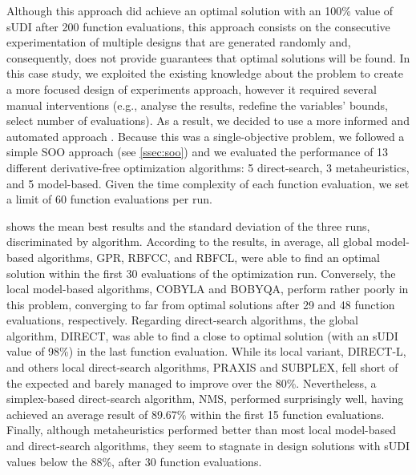 Although this approach did achieve an optimal solution with an 100\% value of sUDI after 200 function evaluations, this approach consists on the consecutive experimentation of multiple designs that are generated randomly and, consequently, does not provide guarantees that optimal solutions will be found. In this case study, we exploited the existing knowledge about the problem to create a more focused design of experiments approach, however it required several manual interventions (e.g., analyse the results, redefine the variables' bounds, select number of evaluations). As a result, we decided to use a more informed and automated approach \cite{Belem2018optimizeddesign}. Because this was a single-objective problem, we followed a simple \ac{SOO} approach (see \cref{ssec:soo}) and we evaluated the performance of 13 different derivative-free optimization algorithms: 5 direct-search, 3 metaheuristics, and 5 model-based. Given the time complexity of each function evaluation, we set a limit of 60 function evaluations per run.

 shows the mean best results and the standard deviation of the three runs,  discriminated by algorithm. According to the results, in average, all global model-based algorithms, GPR, RBFCC, and RBFCL, were able to find an optimal solution within the first 30 evaluations of the optimization run. Conversely, the local model-based algorithms, COBYLA and BOBYQA, perform rather poorly in this problem, converging to far from optimal solutions after 29 and 48 function evaluations, respectively. Regarding direct-search algorithms, the global algorithm, DIRECT, was able to find a close to optimal solution (with an \ac{sUDI} value of 98\%) in the last function evaluation. While its local variant, DIRECT-L, and others local direct-search algorithms, PRAXIS and SUBPLEX, fell short of the expected and barely managed to improve over the 80\%. Nevertheless, a simplex-based direct-search algorithm, NMS, performed surprisingly well, having achieved an average result of 89.67\% within the first 15 function evaluations. Finally, although metaheuristics performed better than most local model-based and direct-search algorithms, they seem to stagnate in design solutions with sUDI values below the 88\%, after 30 function evaluations.

